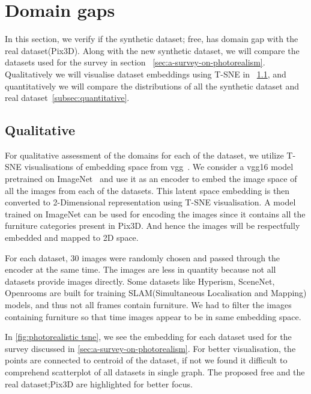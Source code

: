 \section{Domain gaps}\label{sec:domain-gaps}

In this section, we verify if the synthetic dataset;
\gls{free}, has domain gap with the real dataset(Pix3D).
Along with the new synthetic dataset, we will compare the datasets used for the survey in section ~\ref{sec:a-survey-on-photorealism}.
Qualitatively we will visualise dataset embeddings using T-SNE in ~\ref{subsec:qualitative}, and quantitatively we will compare the distributions of all the synthetic dataset and real dataset~\ref{subsec:quantitative}.

\subsection{Qualitative}\label{subsec:qualitative}

For qualitative assessment of the domains for each of the dataset, we utilize T-SNE visualisations of embedding space from \gls{vgg}~\cite{simonyan2015deep}.
We consider a \gls{vgg}16 model pretrained on ImageNet~\cite{Deng2009ImageNetAL} and use it as an encoder to embed the image space of all the images from each of the datasets.
This latent space embedding is then converted to 2-Dimensional representation using T-SNE visualisation.
A model trained on ImageNet can be used for encoding the images since it contains all the furniture categories present in Pix3D\@.
And hence the images will be respectfully embedded and mapped to 2D space.

For each dataset, 30 images were randomly chosen and passed through the encoder at the same time.
The images are less in quantity because not all datasets provide images directly.
Some datasets like Hyperism, SceneNet, Openrooms are built for training SLAM(Simultaneous Localisation and Mapping) models, and thus not all frames contain furniture.
We had to filter the images containing furniture so that time images appear to be in same embedding space.

In \autoref{fig:photorealistic tsne}, we see the embedding for each dataset used for the survey discussed in \autoref{sec:a-survey-on-photorealism}.
For better visualisation, the points are connected to centroid of the dataset,
if not we found it difficult to comprehend scatterplot of all datasets in single graph.
The proposed \gls{free} and the real dataset;Pix3D are highlighted for better focus.

